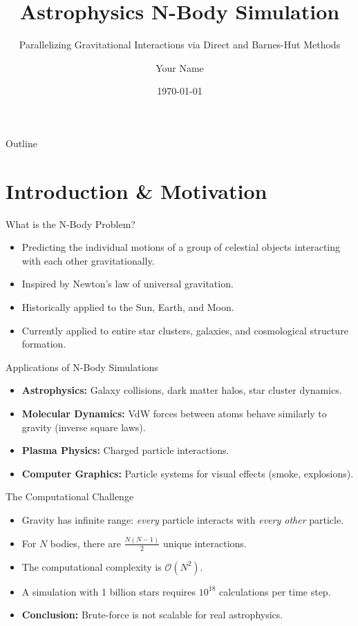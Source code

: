 \documentclass[aspectratio=169]{beamer}
\title[Parallel N-Body Simulation]{Astrophysics N-Body Simulation}
\subtitle{Parallelizing Gravitational Interactions via Direct and Barnes-Hut Methods}
\author{Your Name}
\institute{Your University / Organization}
\date{\today}
\begin{document}
\begin{frame}
    \titlepage
\end{frame}

\begin{frame}{Outline}
    \tableofcontents
\end{frame}

\section{Introduction \& Motivation}
\begin{frame}{What is the N-Body Problem?}
    \begin{itemize}
        \item Predicting the individual motions of a group of celestial objects interacting with each other gravitationally.
        \item Inspired by Newton's law of universal gravitation.
        \item Historically applied to the Sun, Earth, and Moon.
        \item Currently applied to entire star clusters, galaxies, and cosmological structure formation.
    \end{itemize}
\end{frame}

\begin{frame}{Applications of N-Body Simulations}
    \begin{itemize}
        \item \textbf{Astrophysics:} Galaxy collisions, dark matter halos, star cluster dynamics.
        \item \textbf{Molecular Dynamics:} VdW forces between atoms behave similarly to gravity (inverse square laws).
        \item \textbf{Plasma Physics:} Charged particle interactions.
        \item \textbf{Computer Graphics:} Particle systems for visual effects (smoke, explosions).
    \end{itemize}
\end{frame}

\begin{frame}{The Computational Challenge}
    \begin{itemize}
        \item Gravity has infinite range: \textit{every} particle interacts with \textit{every other} particle.
        \item For $N$ bodies, there are $\frac{N(N-1)}{2}$ unique interactions.
        \item The computational complexity is $\mathcal{O}(N^2)$.
        \item A simulation with 1 billion stars requires $10^{18}$ calculations per time step.
        \item \textbf{Conclusion:} Brute-force is not scalable for real astrophysics.
    \end{itemize}
\end{frame}
\end{document}
